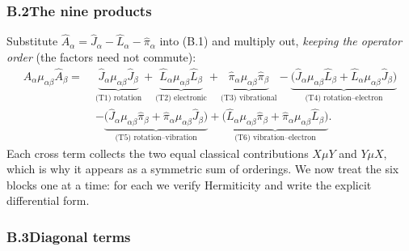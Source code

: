 \subsubsection*{B.2\quad The nine products}

Substitute $\hat A_\alpha=\hat J_\alpha-\hat L_\alpha-\hat\pi_\alpha$ into (B.1) and multiply out, \emph{keeping the operator order} (the factors need not commute):
\begin{align}
\hat A_\alpha\mu_{\alpha\beta}\hat A_\beta
=\;&\underbrace{\hat J_\alpha\mu_{\alpha\beta}\hat J_\beta}_{\text{(T1) rotation}}
+\underbrace{\hat L_\alpha\mu_{\alpha\beta}\hat L_\beta}_{\text{(T2) electronic}}
+\underbrace{\hat\pi_\alpha\mu_{\alpha\beta}\hat\pi_\beta}_{\text{(T3) vibrational}}
-\underbrace{\bigl(\hat J_\alpha\mu_{\alpha\beta}\hat L_\beta+\hat L_\alpha\mu_{\alpha\beta}\hat J_\beta\bigr)}_{\text{(T4) rotation--electron}}\nonumber\\
&-\underbrace{\bigl(\hat J_\alpha\mu_{\alpha\beta}\hat\pi_\beta+\hat\pi_\alpha\mu_{\alpha\beta}\hat J_\beta\bigr)}_{\text{(T5) rotation--vibration}}
+\underbrace{\bigl(\hat L_\alpha\mu_{\alpha\beta}\hat\pi_\beta+\hat\pi_\alpha\mu_{\alpha\beta}\hat L_\beta\bigr)}_{\text{(T6) vibration--electron}} . \tag{B.6}
\end{align}
Each cross term collects the two equal classical contributions $X\mu Y$ and $Y\mu X$, which is why it appears as a symmetric sum of orderings. We now treat the six blocks one at a time: for each we verify Hermiticity and write the explicit differential form.

\subsubsection*{B.3\quad Diagonal terms}


